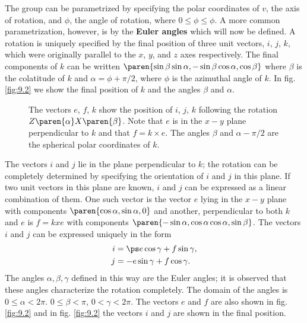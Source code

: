 The group can be parametrized by specifying the polar coordinates of $v$, the axis of rotation, and $\phi$, the angle of rotation, where $0 \le \phi \le \phi$. A more common parametrization, however, is by the \textbf{Euler angles} which will now be defined. A rotation is uniquely specified by the final position of three unit vectors, $i$, $j$, $k$, which were originally parallel to the $x$, $y$, and $z$ axes respectively. The final components of $k$ can be written $\paren{\sin \beta \sin \alpha, -\sin \beta \cos \alpha, \cos \beta}$ where $\beta$ is the colatitude of $k$ and $\alpha = \phi + \pi / 2$, where $\phi$ is the azimuthal angle of $k$. In fig. \eqref{fig:9.2} we show the final position of $k$ and the angles $\beta$ and $\alpha$.

\begin{figure}[htbp] %
   \centering
   \caption{The vectors $e$, $f$, $k$ show the position of $i$, $j$, $k$ following the rotation $Z\paren{\alpha} X\paren{\beta}$. Note that $e$ is in the $x-y$ plane perpendicular to $k$ and that $f = k \times e$. The angles $\beta$ and $\alpha - \pi/2$ are the spherical polar coordinates of $k$.}
   \label{fig:9.2}
\end{figure}

The vectors $i$ and $j$ lie in the plane perpendicular to $k$; the rotation can be completely determined by specifying the orientation of $i$ and $j$ in this plane. If two unit vectors in this plane are known, $i$ and $j$ can be expressed as a linear combination of them. One such vector is the vector $e$ lying in the $x-y$ plane with components $\paren{\cos \alpha, \sin \alpha, 0} $ and another, perpendicular to both $k$ and $e$ is $f = k x e$ with components $\paren{-\sin \alpha, \cos \alpha \cos \alpha, \sin \beta}$. The vectors $i$ and $j$ can be expressed uniquely in the form 
\begin{equation*}
  \begin{split}
    i &=  \ps e \cos \gamma + f \sin \gamma , \\ 
    j &= -e \sin \gamma + f \cos \gamma .
  \end{split}
\end{equation*}
The angles $\alpha, \beta, \gamma$ defined in this way are the Euler angles; it is observed that these angles characterize the rotation completely. The domain of the angles is $0 \le \alpha < 2\pi$. $0 \le \beta < \pi$, $0 < \gamma < 2\pi$. The vectors $e$ and $f$ are also shown in fig. \eqref{fig:9.2} and in fig. \eqref{fig:9.2} the vectors $i$ and $j$ are shown in the final position.

